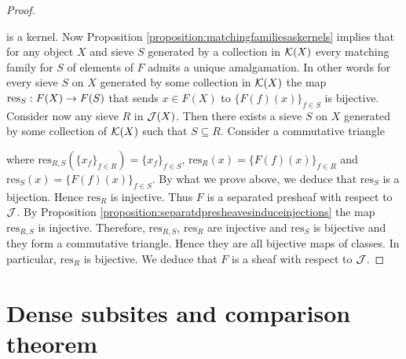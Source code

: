 \begin{proof}
\begin{center}
\end{center}
is a kernel. Now Proposition \ref{proposition:matchingfamiliesaskernels} implies that for any object $X$ and sieve $S$ generated by a collection in ${\mathcal K}(X)$ every matching family for $S$ of elements of $F$ admits a unique amalgamation. In other words for every sieve $S$ on $X$ generated by some collection in ${\mathcal K}(X)$ the map $\mathrm{res}_S:F(X)\rightarrow F(S)$ that sends $x\in F(X)$ to $\{F(f)(x)\}_{f\in S}$ is bijective. Consider now any sieve $R$ in ${\mathcal J}(X)$. Then there exists a sieve $S$ on $X$ generated by some collection of ${\mathcal K}(X)$ such that $S\subseteq R$. Consider a commutative triangle
\begin{center}
\end{center}
where $\mathrm{res}_{R,S}\left(\{x_f\}_{f\in R}\right)=\{x_f\}_{f\in S}$, $\mathrm{res}_{R}(x)=\{F(f)(x)\}_{f\in R}$ and $\mathrm{res}_{S}(x)=\{F(f)(x)\}_{f\in S}$. By what we prove above, we deduce that $\mathrm{res}_S$ is a bijection. Hence $\mathrm{res}_R$ is injective. Thus $F$ is a separated presheaf with respect to ${\mathcal J}$. By Proposition \ref{proposition:separatdpresheavesinduceinjections} the map $\mathrm{res}_{R,S}$ is injective. Therefore, $\mathrm{res}_{R,S}$, $\mathrm{res}_R$ are injective and $\mathrm{res}_S$ is bijective and they form a commutative triangle. Hence they are all bijective maps of classes. In particular, $\mathrm{res}_R$ is bijective. We deduce that $F$ is a sheaf with respect to ${\mathcal J}$.
\end{proof}

\section{Dense subsites and comparison theorem}

